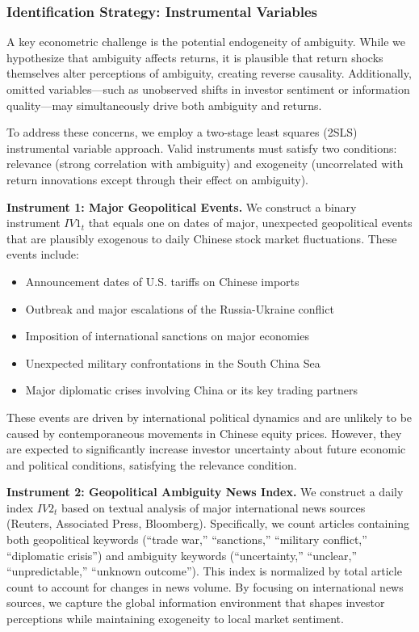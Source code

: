 \documentclass[preprint,12pt,authoryear]{elsarticle}
\begin{document}
\subsubsection{Identification Strategy: Instrumental Variables}

A key econometric challenge is the potential endogeneity of ambiguity. While we hypothesize that ambiguity affects returns, it is plausible that return shocks themselves alter perceptions of ambiguity, creating reverse causality. Additionally, omitted variables—such as unobserved shifts in investor sentiment or information quality—may simultaneously drive both ambiguity and returns.

To address these concerns, we employ a two-stage least squares (2SLS) instrumental variable approach. Valid instruments must satisfy two conditions: relevance (strong correlation with ambiguity) and exogeneity (uncorrelated with return innovations except through their effect on ambiguity).

\textbf{Instrument 1: Major Geopolitical Events.} We construct a binary instrument $IV1_t$ that equals one on dates of major, unexpected geopolitical events that are plausibly exogenous to daily Chinese stock market fluctuations. These events include:
\begin{itemize}
\item Announcement dates of U.S. tariffs on Chinese imports
\item Outbreak and major escalations of the Russia-Ukraine conflict
\item Imposition of international sanctions on major economies
\item Unexpected military confrontations in the South China Sea
\item Major diplomatic crises involving China or its key trading partners
\end{itemize}
These events are driven by international political dynamics and are unlikely to be caused by contemporaneous movements in Chinese equity prices. However, they are expected to significantly increase investor uncertainty about future economic and political conditions, satisfying the relevance condition.

\textbf{Instrument 2: Geopolitical Ambiguity News Index.} We construct a daily index $IV2_t$ based on textual analysis of major international news sources (Reuters, Associated Press, Bloomberg). Specifically, we count articles containing both geopolitical keywords (``trade war,'' ``sanctions,'' ``military conflict,'' ``diplomatic crisis'') and ambiguity keywords (``uncertainty,'' ``unclear,'' ``unpredictable,'' ``unknown outcome''). This index is normalized by total article count to account for changes in news volume. By focusing on international news sources, we capture the global information environment that shapes investor perceptions while maintaining exogeneity to local market sentiment.
\end{document}
